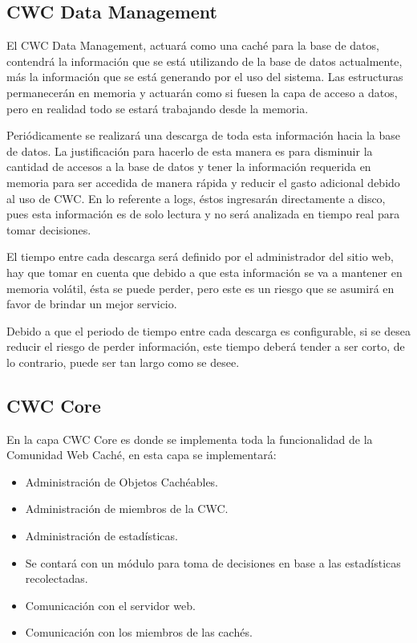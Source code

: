
\subsection{CWC Data Management}

El CWC Data Management, actuará como una caché para la base de datos, contendrá la información que se está utilizando  de la base de datos actualmente, más la información que se está generando por el uso del sistema. Las estructuras permanecerán en memoria y actuarán como si fuesen la capa de acceso a datos, pero en realidad todo se estará trabajando desde la  memoria. 

Periódicamente se realizará una descarga de toda esta información hacia la base de datos. La justificación para hacerlo de esta manera es para disminuir la cantidad de accesos a la base de datos y tener la información requerida en memoria para ser accedida de manera rápida y reducir el gasto adicional debido al uso de CWC. En lo referente a logs, éstos ingresarán directamente a disco, pues esta información es de solo lectura y no será analizada en tiempo real para tomar decisiones. 

El tiempo entre cada descarga será definido por el administrador del sitio web, hay que tomar en cuenta que debido a que esta información se va a mantener en memoria volátil, ésta se puede perder, pero este es un riesgo que se asumirá en favor de brindar un mejor servicio. 

Debido a que el periodo de tiempo entre cada descarga es configurable, si se desea reducir el riesgo de perder información, este tiempo deberá tender a ser corto, de lo contrario, puede ser tan largo como se desee. 



\subsection{CWC Core}

En la capa CWC Core es donde se implementa toda la funcionalidad de la Comunidad Web Caché, en esta capa se implementará:

\begin{itemize}
\item Administración de Objetos Cachéables.
\item Administración de miembros de la CWC.
\item Administración de estadísticas.
\item Se contará con un módulo para toma de decisiones en base a las estadísticas recolectadas.
\item Comunicación con el servidor web.
\item Comunicación con los miembros de las cachés.
\end{itemize}

